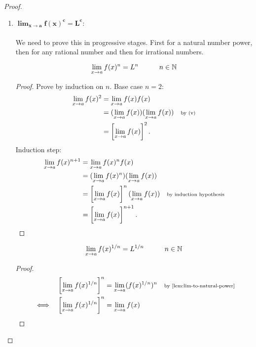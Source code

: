 \documentclass[../MathsNotesBase.tex]{subfiles}
\begin{document}
{\begin{proof}
\begin{enumerate}[label=(\roman*)]
{\begin{proof}
					\end{proof}
					\bigskip
					Now we can use (v) to deduce that, 
					\[ \lim_{x \to a} \frac{f(x)}{g(x)} = (\lim_{x \to a} f(x))\left(\lim_{x \to a} \frac{1}{g(x)}\right) = L \cdot \frac{1}{M} = \frac{L}{M}. \]
				}
				\item{${\bm{ \lim_{x \to a} f(x)^c = L^c }}$:\\\\
					We need to prove this in progressive stages. First for a natural number power, then for any rational number and then for irrational numbers.
					\begin{lemma}\label{lem:lim-to-natural-power}
						\[ \lim_{x \to a} f(x)^n = L^n \hspace{30pt} n \in \mathbb{N}^{} \]
					\end{lemma}
					\begin{proof}
						Prove by induction on $n$. Base case ${ n = 2 }$:
						\begin{align*}
						\lim_{x \to a} f(x)^2 &= \lim_{x \to a} f(x)f(x) \\
						&= (\lim_{x \to a} f(x))(\lim_{x \to a} f(x)) &\text{\scriptsize{by (v)}} \\
						&= \left[\lim_{x \to a} f(x)\right]^2.
						\end{align*}
						Induction step:
						\begin{align*}
						\lim_{x \to a} f(x)^{n+1} &= \lim_{x \to a} f(x)^nf(x) \\
						&= (\lim_{x \to a} f(x)^n)(\lim_{x \to a} f(x)) &\text{\scriptsize{}} \\
						&= \left[\lim_{x \to a} f(x)\right]^n(\lim_{x \to a} f(x)) &\text{\scriptsize{by induction hypothesis}} \\
						&= \left[\lim_{x \to a} f(x)\right]^{n+1}. \qedhere
						\end{align*}						
					\end{proof}
					\begin{lemma}\label{lem:limit-of-nth-root-is-nth-root-of-limit}
						\[ \lim_{x \to a} f(x)^{1/n} = L^{1/n} \hspace{30pt} n \in \mathbb{N}^{} \]
					\end{lemma}
					\begin{proof}
						\begin{align*}
						&& \left[\lim_{x \to a} f(x)^{1/n}\right]^n &= \lim_{x \to a} (f(x)^{1/n})^n &\sidecomment{by \autoref{lem:lim-to-natural-power}}\\
						&\iff & \left[\lim_{x \to a} f(x)^{1/n}\right]^n &= \lim_{x \to a} f(x) &\sidecomment{} \\

\end{align*}
\end{proof}}
\end{enumerate}
\end{proof}}
\end{document}
